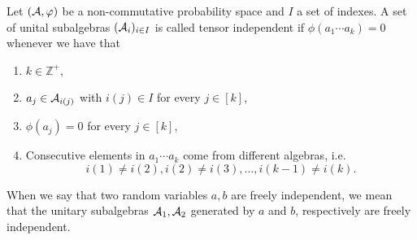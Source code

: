 





    \begin{definition}
        Let $(\mathcal A, \varphi)$ be a non-commutative probability space and $I$ a set of indexes. A set of unital subalgebras $(\mathcal A_{i})_{i\in I}$ is called tensor independent if $\phi(a_1 \cdots a_k) = 0$ whenever we have that

        \begin{enumerate}
            \item $k \in \mathbb Z^+$,
            \item $a_j \in \mathcal A_{i(j)}$ with $i(j) \in I$ for every $j \in [k]$,
            \item $\phi(a_j) = 0$ for every $j \in [k]$,
            \item Consecutive elements in $a_1 \cdots a_k$ come from different algebras, i.e.
            \begin{equation*}
                i(1) \neq i(2), i(2) \neq i(3), \dots, i(k-1) \neq i(k).
            \end{equation*}
        \end{enumerate}

        When we say that two random variables $a,b$ are freely independent, we mean that the unitary subalgebras $\mathcal A_1, \mathcal A_2$ generated by $a$ and $b$, respectively are freely independent.

    \end{definition}


